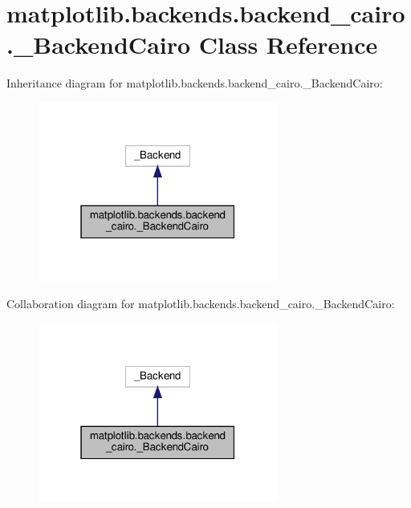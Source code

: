 \hypertarget{classmatplotlib_1_1backends_1_1backend__cairo_1_1__BackendCairo}{}\section{matplotlib.\+backends.\+backend\+\_\+cairo.\+\_\+\+Backend\+Cairo Class Reference}
\label{classmatplotlib_1_1backends_1_1backend__cairo_1_1__BackendCairo}


Inheritance diagram for matplotlib.\+backends.\+backend\+\_\+cairo.\+\_\+\+Backend\+Cairo\+:
\nopagebreak
\begin{figure}[H]
\begin{center}
\leavevmode
\includegraphics[width=223pt]{classmatplotlib_1_1backends_1_1backend__cairo_1_1__BackendCairo__inherit__graph}
\end{center}
\end{figure}


Collaboration diagram for matplotlib.\+backends.\+backend\+\_\+cairo.\+\_\+\+Backend\+Cairo\+:
\nopagebreak
\begin{figure}[H]
\begin{center}
\leavevmode
\includegraphics[width=223pt]{classmatplotlib_1_1backends_1_1backend__cairo_1_1__BackendCairo__coll__graph}
\end{center}
\end{figure}
